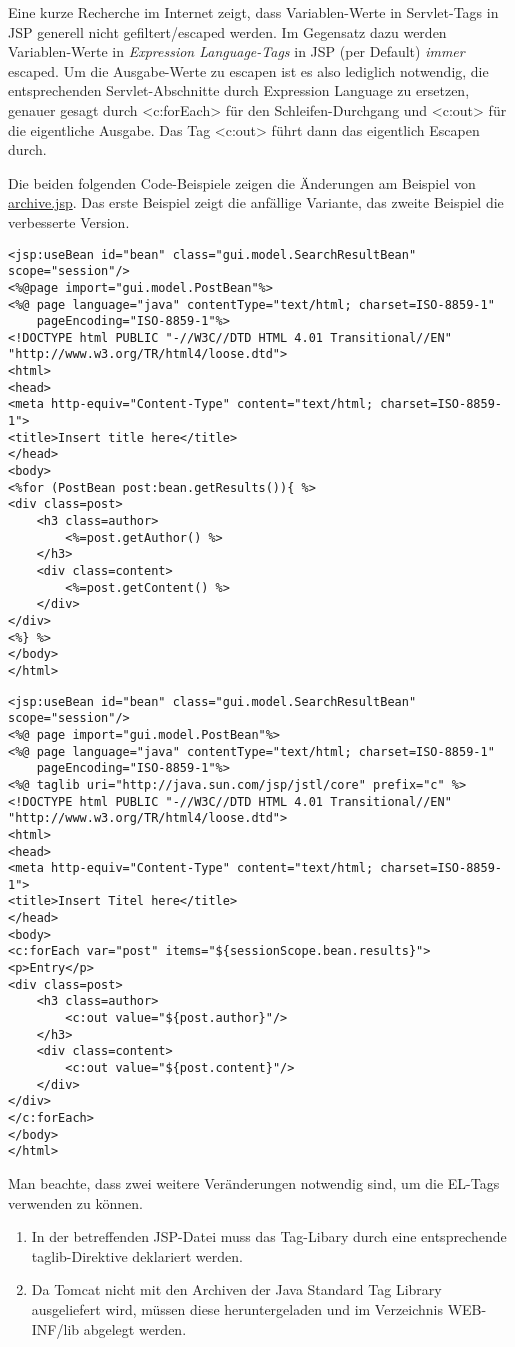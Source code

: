 Eine kurze Recherche im Internet zeigt, dass Variablen-Werte in Servlet-Tags in JSP generell nicht gefiltert/escaped werden. Im Gegensatz dazu werden Variablen-Werte in \emph{Expression Language-Tags} in JSP (per Default) \emph{immer} escaped. Um die Ausgabe-Werte zu escapen ist es also lediglich notwendig, die entsprechenden Servlet-Abschnitte durch Expression Language zu ersetzen, genauer gesagt durch <c:forEach> für den Schleifen-Durchgang und <c:out> für die eigentliche Ausgabe. Das Tag <c:out> führt dann das eigentlich Escapen durch.

Die beiden folgenden Code-Beispiele zeigen die Änderungen am Beispiel von \url{archive.jsp}. Das erste Beispiel zeigt die anfällige Variante, das zweite Beispiel die verbesserte Version.

\begin{lstlisting}
<jsp:useBean id="bean" class="gui.model.SearchResultBean" scope="session"/>
<%@page import="gui.model.PostBean"%>
<%@ page language="java" contentType="text/html; charset=ISO-8859-1"
    pageEncoding="ISO-8859-1"%>
<!DOCTYPE html PUBLIC "-//W3C//DTD HTML 4.01 Transitional//EN" "http://www.w3.org/TR/html4/loose.dtd">
<html>
<head>
<meta http-equiv="Content-Type" content="text/html; charset=ISO-8859-1">
<title>Insert title here</title>
</head>
<body>
<%for (PostBean post:bean.getResults()){ %>
<div class=post>
	<h3 class=author>
		<%=post.getAuthor() %>
	</h3>
	<div class=content>
		<%=post.getContent() %>
	</div>
</div>
<%} %>
</body>
</html>
\end{lstlisting}

\begin{lstlisting}
<jsp:useBean id="bean" class="gui.model.SearchResultBean" scope="session"/>
<%@ page import="gui.model.PostBean"%>
<%@ page language="java" contentType="text/html; charset=ISO-8859-1"
    pageEncoding="ISO-8859-1"%>
<%@ taglib uri="http://java.sun.com/jsp/jstl/core" prefix="c" %>    
<!DOCTYPE html PUBLIC "-//W3C//DTD HTML 4.01 Transitional//EN" "http://www.w3.org/TR/html4/loose.dtd">
<html>
<head>
<meta http-equiv="Content-Type" content="text/html; charset=ISO-8859-1">
<title>Insert Titel here</title>
</head>
<body>
<c:forEach var="post" items="${sessionScope.bean.results}">
<p>Entry</p>
<div class=post>
	<h3 class=author>
		<c:out value="${post.author}"/>
	</h3>
	<div class=content>
		<c:out value="${post.content}"/>
	</div>
</div>
</c:forEach>
</body>
</html>
\end{lstlisting}

Man beachte, dass zwei weitere Veränderungen notwendig sind, um die EL-Tags verwenden zu können.
\begin{enumerate}
\item In der betreffenden JSP-Datei muss das Tag-Libary durch eine entsprechende taglib-Direktive deklariert werden. 
\item Da Tomcat nicht mit den Archiven der Java Standard Tag Library ausgeliefert wird, müssen diese heruntergeladen und im Verzeichnis WEB-INF/lib abgelegt werden.
\end{enumerate}

